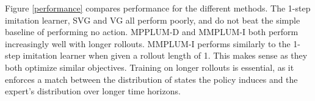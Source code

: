 \documentclass{article} %
\begin{document}

Figure \ref{performance} compares performance for the different methods.
The 1-step imitation learner, SVG and VG all perform poorly, and do not beat the simple baseline of performing no action.
MPPLUM-D and MMPLUM-I both perform increasingly well with longer rollouts.
MMPLUM-I performs similarly to the 1-step imitation learner when given a rollout length of 1.
This makes sense as they both optimize similar objectives. 
Training on longer rollouts is essential, as it enforces a match between the distribution of states the policy induces and the expert's distribution over longer time horizons.
\end{document}
